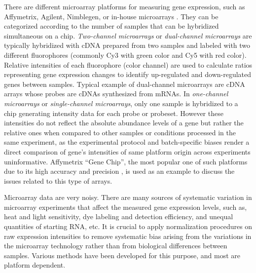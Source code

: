 There are different microarray platforms for measuring gene expression, such as
Affymetrix, Agilent, Nimblegen, or in-house microarrays \cite{Sasik2004}.
They can be categorized according to the number of samples that can be
hybridized simultaneous on a chip.
%
\textit{Two-channel microarrays} or \textit{dual-channel microarrays}
are typically hybridized with cDNA prepared from two samples and
labeled with two different fluorophores (commonly Cy3 with green
color and Cy5 with red color).
%
Relative intensities of each fluorophore (color channel) are used to calculate
ratios representing gene expression changes to identify up-regulated and
down-regulated genes between samples.
%
Typical example of dual-channel microarrays are cDNA arrays whose
probes are cDNAs synthesized from mRNAs.
%
In \textit{one-channel microarrays} or \textit{single-channel
  microarrays}, only one sample is hybridized to a chip generating
intensity data for each probe or probeset.
%
However these intensities do not reflect the absolute abundance levels of a
gene but rather the relative ones when compared to other samples or conditions
processed in the same experiment, as the experimental protocol and
batch-specific biases render a direct comparison of gene's intensities of same
platform origin across experiments uninformative.
%
Affymetrix ``Gene Chip'', the most popular one of such platforms due to its
high accuracy and precision \cite{Irizarry2005}, is used as an example to
discuss the issues related to this type of arrays.


Microarray data are very noisy.  There are many sources of systematic variation
in microarray experiments that affect the measured gene expression levels, such
as, heat and light sensitivity, dye labeling and detection efficiency, and
unequal quantities of starting RNA, etc.
%
It is crucial to apply normalization procedures on raw expression intensities
to remove systematic bias arising from the variations in the microarray
technology rather than from biological differences between samples.
%
Various methods have been developed for this purpose, and most are platform
dependent.

